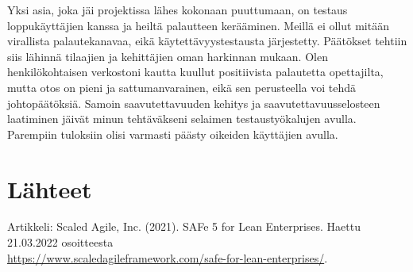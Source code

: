 \documentclass{article}
\begin{document}
Yksi asia, joka jäi projektissa lähes kokonaan puuttumaan, on testaus
loppukäyttäjien kanssa ja heiltä palautteen kerääminen. Meillä ei ollut mitään
virallista palautekanavaa, eikä käytettävyystestausta järjestetty. Päätökset
tehtiin siis lähinnä tilaajien ja kehittäjien oman harkinnan mukaan. Olen
henkilökohtaisen verkostoni kautta kuullut positiivista palautetta opettajilta,
mutta otos on pieni ja sattumanvarainen, eikä sen perusteella voi tehdä
johtopäätöksiä. Samoin saavutettavuuden kehitys ja saavutettavuusselosteen
laatiminen jäivät minun tehtäväkseni selaimen testaustyökalujen avulla.
Parempiin tuloksiin olisi varmasti päästy oikeiden käyttäjien avulla.

\section{Lähteet}

Artikkeli: Scaled Agile, Inc. (2021). SAFe 5 for Lean Enterprises. Haettu 21.03.2022 osoitteesta
\\ \url{https://www.scaledagileframework.com/safe-for-lean-enterprises/}.
\end{document}
